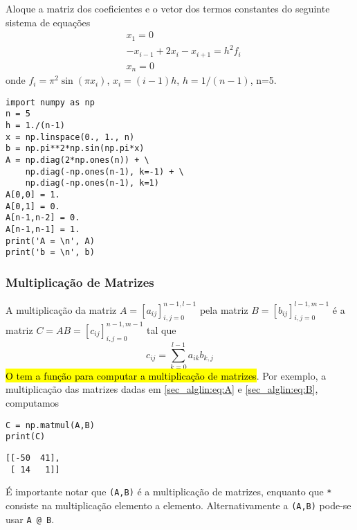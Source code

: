 \begin{exer}\label{sec_matricial:exer:laplaceprob}
  Aloque a matriz dos coeficientes e o vetor dos termos constantes do seguinte sistema de equações
  \begin{equation}
    \begin{aligned}
      & x_1 = 0 \\
      & -x_{i-1} + 2x_{i} - x_{i+1} = h^2f_i \\
      & x_n = 0
    \end{aligned}
  \end{equation}
  onde $f_i = \pi^2\sin(\pi x_i)$, $x_i = (i-1)h$, $h = 1/(n-1)$, n=5.
\end{exer}
\begin{resp}
  
\begin{lstlisting}
import numpy as np
n = 5
h = 1./(n-1)
x = np.linspace(0., 1., n)
b = np.pi**2*np.sin(np.pi*x)
A = np.diag(2*np.ones(n)) + \
    np.diag(-np.ones(n-1), k=-1) + \
    np.diag(-np.ones(n-1), k=1)
A[0,0] = 1.
A[0,1] = 0.
A[n-1,n-2] = 0.
A[n-1,n-1] = 1.
print('A = \n', A)
print('b = \n', b)
\end{lstlisting}

\end{resp}


\subsubsection{Multiplicação de Matrizes}

A multiplicação da matriz $A = [a_{ij}]_{i,j=0}^{n-1,l-1}$ pela matriz $B = [b_{ij}]_{i,j=0}^{l-1,m-1}$ é a matriz $C = AB = [c_{ij}]_{i,j=0}^{n-1,m-1}$ tal que
\begin{equation}
  c_{ij} = \sum_{k=0}^{l-1} a_{ik}b_{k,j}
\end{equation}
\hl{O {\PYTHONnumpy} tem a função {\PYTHONnumpyDOTmatmul} para computar a multiplicação de matrizes}. Por exemplo, a multiplicação das matrizes dadas em \eqref{sec_alglin:eq:A} e \eqref{sec_alglin:eq:B}, computamos

\begin{lstlisting}
C = np.matmul(A,B)
print(C)
\end{lstlisting}

\begin{verbatim}
[[-50  41],
 [ 14   1]]
\end{verbatim}

\begin{obs}[\hl{\texttt{matmul}, \texttt{*}, \texttt{@}}]
  É importante notar que {\PYTHONnumpyDOTmatmul}\texttt{(A,B)} é a multiplicação de matrizes, enquanto que \texttt{*} consiste na multiplicação elemento a elemento. Alternativamente a {\PYTHONnumpyDOTmatmul}\texttt{(A,B)} pode-se usar \texttt{A @ B}.
\end{obs}

